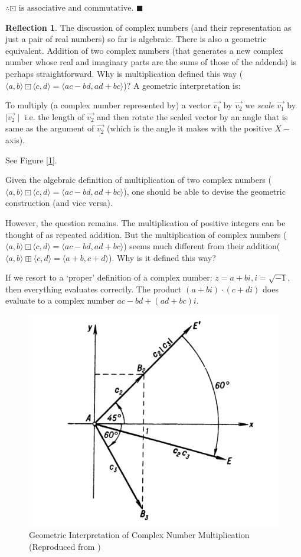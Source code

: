 \documentclass[english,notitlepage,smartquotes]{hgbreport}
\theoremstyle{definition}
\theoremstyle{definition}
\theoremstyle{remark}
\theoremstyle{definition}
\theoremstyle{plain}
\renewcommand\qedsymbol{$\blacksquare$}
\theoremstyle{definition}
\newtheorem{reflection}{Reflection}
\begin{document}
$\therefore \boxdot \text{ is associative and commutative}$. 
\qedsymbol
\begin{reflection}
The discussion of complex numbers (and their representation as just a pair of real numbers) so far is algebraic. There is also a geometric equivalent. Addition of two complex numbers (that generates a new complex number whose real and imaginary parts are the sums of those of the addends) is perhaps straightforward. Why is multiplication defined this way ($\langle a,b\rangle\boxdot\langle c,d\rangle=\langle ac-bd,ad+bc\rangle$)? A geometric interpretation is:
\begin{sidebar}
To multiply (a complex number represented by) a vector $\vec{v_1}$ by $\vec{v_2}$ we \textit{scale} $\vec{v_1}$ by $\mid \vec{v_2}\mid$ i.e. the length of $\vec{v_2}$ and then rotate the scaled vector by an angle that is same as the argument of $\vec{v_2}$ (which is the angle it makes with the positive $X-$axis).

See Figure [\ref{fig:complexmult}].
\end{sidebar} 
Given the algebraic definition of multiplication of two complex numbers ($\langle a,b\rangle\boxdot\langle c,d\rangle=    \langle ac-bd,ad+bc\rangle$), one should be able to devise the geometric construction (and vice versa).

However, the question remains. The multiplication of positive integers can be thought of as repeated addition. But the multiplication of complex numbers ($\langle a,b\rangle\boxdot\langle c,d\rangle=    \langle ac-bd,ad+bc\rangle$) seems much different from their addition($\langle a,b\rangle\boxplus\langle c,d\rangle=\langle a+b,c+d\rangle$). Why is it defined this way?

If we resort to a `proper' definition of a complex number: $z=a+bi, i=\sqrt{-1}$, then everything evaluates correctly. The product $(a+bi)\cdot(c+di)$ does evaluate to a complex number $ac-bd+(ad+bc)i$.
\end{reflection}
\begin{figure}[h]
\begin{center}
\caption{Geometric Interpretation of Complex Number Multiplication (Reproduced from \cite{AleksanovaMarkushevich1982})}
\label{fig:complexmult}
\includegraphics[width=.3\textwidth]{c1xc2} 
\end{center}
\end{figure}
\end{document}
